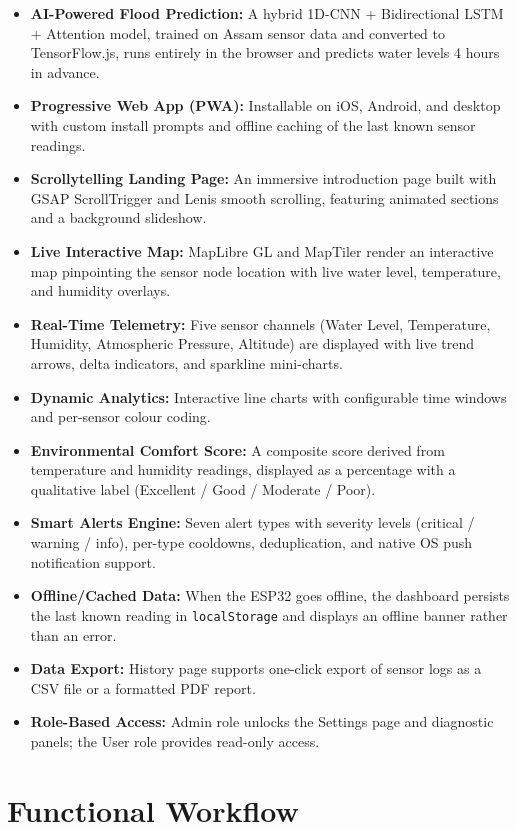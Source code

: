 \begin{itemize}[leftmargin=1.5em]
  \item \textbf{AI-Powered Flood Prediction:} A hybrid 1D-CNN + Bidirectional LSTM + Attention model, trained on Assam sensor data and converted to TensorFlow.js, runs entirely in the browser and predicts water levels 4 hours in advance.
  \item \textbf{Progressive Web App (PWA):} Installable on iOS, Android, and desktop with custom install prompts and offline caching of the last known sensor readings.
  \item \textbf{Scrollytelling Landing Page:} An immersive introduction page built with GSAP ScrollTrigger and Lenis smooth scrolling, featuring animated sections and a background slideshow.
  \item \textbf{Live Interactive Map:} MapLibre GL and MapTiler render an interactive map pinpointing the sensor node location with live water level, temperature, and humidity overlays.
  \item \textbf{Real-Time Telemetry:} Five sensor channels (Water Level, Temperature, Humidity, Atmospheric Pressure, Altitude) are displayed with live trend arrows, delta indicators, and sparkline mini-charts.
  \item \textbf{Dynamic Analytics:} Interactive line charts with configurable time windows and per-sensor colour coding.
  \item \textbf{Environmental Comfort Score:} A composite score derived from temperature and humidity readings, displayed as a percentage with a qualitative label (Excellent / Good / Moderate / Poor).
  \item \textbf{Smart Alerts Engine:} Seven alert types with severity levels (critical / warning / info), per-type cooldowns, deduplication, and native OS push notification support.
  \item \textbf{Offline/Cached Data:} When the ESP32 goes offline, the dashboard persists the last known reading in \texttt{localStorage} and displays an offline banner rather than an error.
  \item \textbf{Data Export:} History page supports one-click export of sensor logs as a CSV file or a formatted PDF report.
  \item \textbf{Role-Based Access:} Admin role unlocks the Settings page and diagnostic panels; the User role provides read-only access.
\end{itemize}

\section{Functional Workflow}

